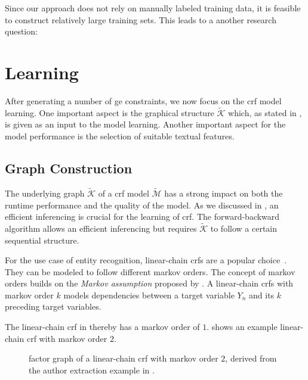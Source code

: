 \bigskip

Since our approach does not rely on manually labeled training data, it is feasible to construct relatively large training sets.
This leads to a another research question:
\newcommand\researchquestionsix{}
\researchquestionsix%




\section{Learning }\label{sec:ae-learning-crfs}

After generating a number of \gls{ge} constraints, we now focus on the \gls{crf} model learning.
One important aspect is the graphical structure $\mathcal{\tilde{K}}$ which, as stated in , is given as an input to the model learning.
Another important aspect for the model performance is the selection of suitable textual features.

\subsection{Graph Construction}\label{subsec:ae-graph-construction}

The underlying graph $\mathcal{\tilde{K}}$ of a \gls{crf} model $\mathcal{\tilde{M}}$ has a strong impact on both the runtime performance and the quality of the model.
As we discussed in , an efficient inferencing is crucial for the learning of \gls{crf}.
The \gls{forward-backward algorithm} allows an efficient inferencing but requires $\mathcal{\tilde{K}}$ to follow a certain sequential structure.

For the use case of entity recognition, \glspl{linear-chain crf} are a popular choice~\citep[e.g.][]{peng2004accurate,mann2008generalized,ling2012fine,groza2012reference,lu2013web,ohta2014empirical}.
They can be modeled to follow different \glspl{markov order}.
The concept of \glspl{markov order} builds on the \textit{Markov assumption} proposed by \citet{markov1957theory}.
A \glspl{linear-chain crf} with \gls{markov order} $k$ models dependencies between a \gls{target variable} $Y_n$ and its $k$ preceding \glspl{target variable}.

The \gls{linear-chain crf} in  thereby has a \gls{markov order} of $1$.
 shows an example \gls{linear-chain crf} with \gls{markov order} $2$.
\begin{figure}[t]
\centering

\caption{%
  \Gls{factor graph} of a \gls{linear-chain crf} with \gls{markov order} $2$, derived from the author extraction example in .}
\label{fig:example-linear-chain-crf-markov-order-2}
\end{figure}

